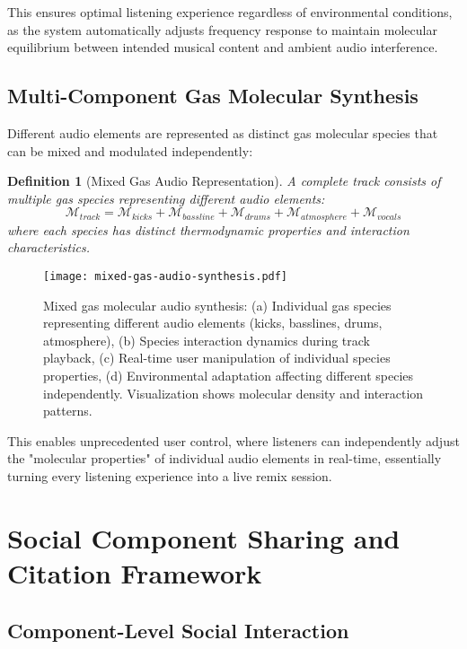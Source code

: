 \documentclass[12pt,a4paper]{article}
\newtheorem{definition}[theorem]{Definition}
\begin{document}
This ensures optimal listening experience regardless of environmental conditions, as the system automatically adjusts frequency response to maintain molecular equilibrium between intended musical content and ambient audio interference.

\subsection{Multi-Component Gas Molecular Synthesis}

Different audio elements are represented as distinct gas molecular species that can be mixed and modulated independently:

\begin{definition}[Mixed Gas Audio Representation]
A complete track consists of multiple gas species representing different audio elements:
\begin{equation}
\mathcal{M}_{track} = \mathcal{M}_{kicks} + \mathcal{M}_{bassline} + \mathcal{M}_{drums} + \mathcal{M}_{atmosphere} + \mathcal{M}_{vocals}
\end{equation}
where each species has distinct thermodynamic properties and interaction characteristics.
\end{definition}

\begin{figure}[h]
\centering
\texttt{[image: mixed-gas-audio-synthesis.pdf]}
\caption{Mixed gas molecular audio synthesis: (a) Individual gas species representing different audio elements (kicks, basslines, drums, atmosphere), (b) Species interaction dynamics during track playback, (c) Real-time user manipulation of individual species properties, (d) Environmental adaptation affecting different species independently. Visualization shows molecular density and interaction patterns.}
\label{fig:mixed_gas_synthesis}
\end{figure}

This enables unprecedented user control, where listeners can independently adjust the "molecular properties" of individual audio elements in real-time, essentially turning every listening experience into a live remix session.

\section{Social Component Sharing and Citation Framework}

\subsection{Component-Level Social Interaction}
\end{document}
